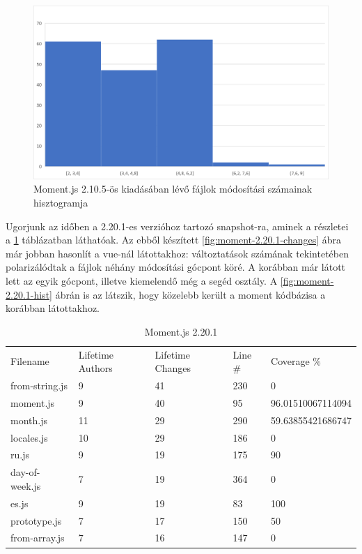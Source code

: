 \begin{figure}[H]
    \centering
    \includegraphics[width=1\textwidth]{images/moment/moment-2.10.5-hist.png}
    \caption{Moment.js 2.10.5-ös kiadásában lévő fájlok módosítási számainak hisztogramja}
    \label{fig:moment-2.10.1-hist}
\end{figure}

Ugorjunk az időben a 2.20.1-es verzióhoz tartozó snapshot-ra, aminek a részletei a \ref{tab:moment-2.20.1} táblázatban láthatóak. Az ebből készített \ref{fig:moment-2.20.1-changes} ábra már jobban hasonlít a vue-nál látottakhoz: változtatások számának tekintetében polarizálódtak a fájlok néhány módosítási gócpont köré. A korábban már látott  lett az egyik gócpont, illetve kiemelendő még a  segéd osztály. A \ref{fig:moment-2.20.1-hist} ábrán is az látszik, hogy közelebb került a moment kódbázisa a korábban látottakhoz.

\begin{table}[h]
    \centering
    \begin{tabular}{l|l|l|l|l}
        Filename       & Lifetime Authors & Lifetime Changes & Line \# & Coverage \%       \\
        from-string.js & 9                & 41               & 230     & 0                 \\
        moment.js      & 9                & 40               & 95      & 96.01510067114094 \\
        month.js       & 11               & 29               & 290     & 59.63855421686747 \\
        locales.js     & 10               & 29               & 186     & 0                 \\
        ru.js          & 9                & 19               & 175     & 90                \\
        day-of-week.js & 7                & 19               & 364     & 0                 \\
        es.js          & 9                & 19               & 83      & 100               \\
        prototype.js   & 7                & 17               & 150     & 50                \\
        from-array.js  & 7                & 16               & 147     & 0
    \end{tabular}
    \caption{Moment.js 2.20.1}
    \label{tab:moment-2.20.1}
\end{table}

